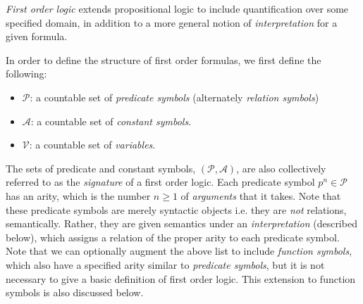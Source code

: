 \documentclass[10pt]{article}
\begin{document}
\textit{First order logic} extends propositional logic to include quantification over some specified domain, in addition to a more general notion of \textit{interpretation} for a given formula.

In order to define the structure of first order formulas, we first define the following:
\begin{itemize}
    \item $\mathcal{P}$: a countable set of \textit{predicate symbols} (alternately \textit{relation symbols})
    \item  $\mathcal{A}$: a countable set of \textit{constant symbols}.
    \item $\mathcal{V}$: a countable set of \textit{variables}.
\end{itemize}
The sets of predicate and constant symbols, $(\mathcal{P}, \mathcal{A})$, are also collectively referred to as the \textit{signature} of a first order logic. Each predicate symbol $p^n \in \mathcal{P}$ has an arity, which is the number $n \geq 1$ of \textit{arguments} that it takes. Note that these predicate symbols are merely syntactic objects i.e. they are \textit{not} relations, semantically. Rather, they are given semantics under an \textit{interpretation} (described below), which assigns a relation of the proper arity to each predicate symbol. Note that we can optionally augment the above list to include \textit{function symbols}, which also have a specified arity similar to \textit{predicate symbols}, but it is not necessary to give a basic definition of first order logic. This extension to function symbols is also discussed below.
\end{document}
